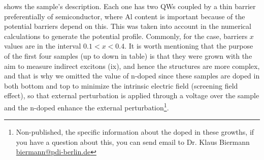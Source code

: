  shows the sample's description. Each one has two \gls{QW}s coupled by a thin barrier preferentially of \algaas semiconductor, where Al content is important because of the
potential barriers depend on this. This was taken into account in the numerical calculations to generate the potential profile. Commonly, for the case, \algaas barriers $x$ values are in the interval  $0.1<x<0.4$. It is worth mentioning that the purpose of the first four samples (up to down in table) is that they were grown with the aim to measure indirect excitons (\gls{ix}), and hence the structures are more complex, and that is why we omitted the value of n-doped since these samples are doped in both bottom and top to minimize the intrinsic electric field (screening field
effect), so that external perturbation is applied through a voltage over the sample \cite{yuan2018tunneling}
and the n-doped enhance the external perturbation\footnote{Non-published, the specific information about the doped  in these growths, if you have a question about this, you can send email to Dr. Klaus Biermann \url{biermann@pdi-berlin.de}}.


